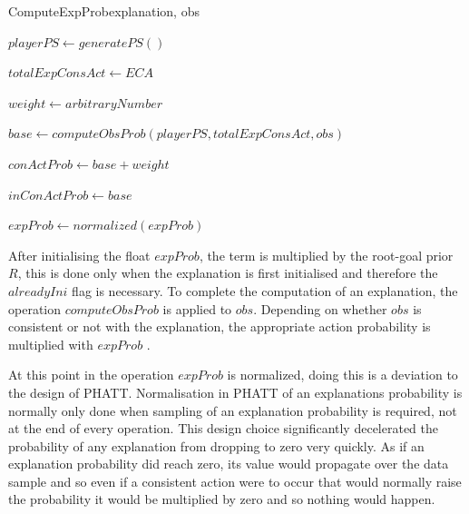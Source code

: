 \documentclass[parskip]{cs4rep}
\begin{document}
\begin{pseudocode}[ruled]{ComputeExpProb}{explanation, obs}
\begin{algorithm}[H]


$playerPS \gets generatePS()$

$totalExpConsAct \gets ECA$

$weight \gets arbitraryNumber$ \newline

$base \gets computeObsProb(playerPS, totalExpConsAct, obs)$ 

$conActProb \gets base + weight$

$inConActProb \gets base$ \newline


$expProb \gets normalized(expProb)$

\end{algorithm}
\end{pseudocode}

After initialising the float $expProb$, the term is multiplied by the root-goal prior $R$, this is done only when the explanation is first initialised and therefore the $alreadyIni$ flag is necessary. To complete the computation of an explanation, the operation $computeObsProb$ is applied to $obs$. Depending on whether $obs$ is consistent or not with the explanation, the appropriate action probability is multiplied with $expProb$ .

At this point in the operation $expProb$ is normalized, doing this is a deviation to the design of PHATT. Normalisation in PHATT of an explanations probability is normally only done when sampling of an explanation probability is required, not at the end of every operation. This design choice significantly decelerated the probability of any explanation from dropping to zero very quickly. As if an explanation probability did reach zero, its value would propagate over the data sample and so even if a consistent action were to occur that would normally raise the probability it would be multiplied by zero and so nothing would happen. 
\end{document}

